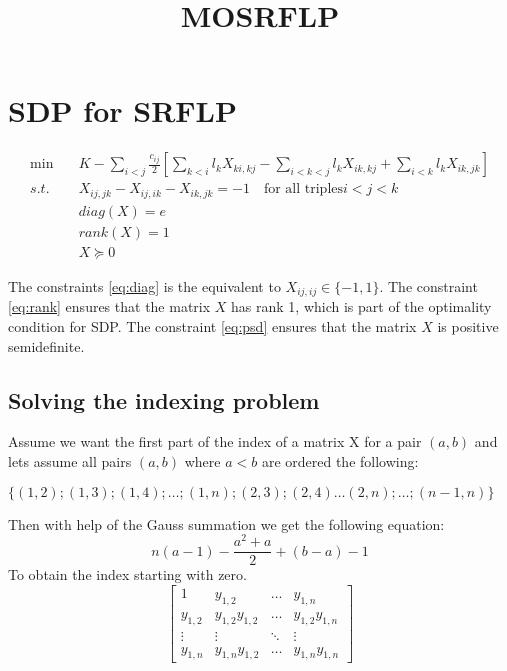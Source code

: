 \documentclass[a4paper]{article}
\begin{document}
\title{MOSRFLP}

\section*{SDP for SRFLP}

\begin{align}
    \min \quad & K - \sum_{i < j} \frac{c_{ij}}{2} \left[\sum_{k<i} l_k X_{ki,kj} - \sum_{i<k<j} l_k X_{ik,kj} + \sum_{i<k} l_k X_{ik,jk}\right]  \label{eq:obj} \\
    s.t. \quad & X_{ij,jk} - X_{ij,ik} - X_{ik,jk} = -1 \quad \text{for all triples} i < j < k                                                   \label{eq:transitivity} \\
               & diag(X) = e                                                                                                                      \label{eq:diag} \\
               & rank(X) = 1                                                                                                                      \label{eq:rank} \\
               & X \succeq 0 \label{eq:psd}
\end{align}

The constraints \eqref{eq:diag} is the equivalent to $X_{ij,ij} \in \{-1,1\}$. The constraint \eqref{eq:rank} ensures that the matrix $X$ has rank 1, which is part of the optimality condition for SDP. The constraint \eqref{eq:psd} ensures that the matrix $X$ is positive semidefinite.


\subsection*{Solving the indexing problem}
Assume we want the first part of the index of a matrix X for a pair $(a,b)$ and lets assume all pairs $(a,b)$ where $a < b$ are ordered the following:

$\{(1, 2); (1, 3); (1, 4); \dots; (1, n); (2, 3); (2, 4) \dots (2, n); \dots; (n-1, n)\}$

Then with help of the Gauss summation we get the following equation:
\begin{equation}
    n(a-1)-\frac{a^2+a}{2} + (b-a)-1
\end{equation}
To obtain the index starting with zero.
\[
\begin{bmatrix}
    1       &   y_{1,2}         &   \dots   &   y_{1,n} \\
    y_{1,2} &   y_{1,2}y_{1,2}  &   \dots   &   y_{1,2}y_{1,n} \\
    \vdots  &   \vdots          &   \ddots  &   \vdots \\
    y_{1,n} &   y_{1,n}y_{1,2}  &   \dots   &   y_{1,n}y_{1,n}     
\end{bmatrix}
\]
\end{document}
